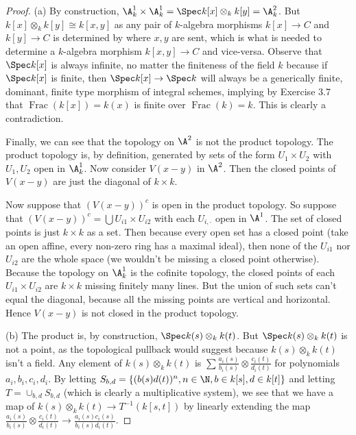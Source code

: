\begin{proof}
	(a) By construction, $\A^1_k \times \A^1_k = \Spec k[x] \otimes_k k[y] = \A^2_k$.
	But $k[x] \otimes_k k[y] \cong k[x,y] $ as any pair of $k $-algebra morphisms $k[x] \to C $ and $k[y] \to C$ is determined by where $x,y $ are sent, which is what is needed to determine a $k $-algebra morphism $k[x,y] \to C $ and vice-versa.
	Observe that $\Spec k[x] $ is always infinite, no matter the finiteness of the field $k $ because if $\Spec k[x] $ is finite, then $\Spec k[x] \to \Spec k $ will always be a generically finite, dominant, finite type morphism of integral schemes, implying by Exercise 3.7 that $\operatorname{Frac}(k[x]) = k(x) $ is finite over $\operatorname{Frac}(k) = k $.
	This is clearly a contradiction.

	Finally, we can see that the topology on $\A^2 $ is not the product topology.
	The product topology is, by definition, generated by sets of the form $U_1 \times U_2 $ with $U_{1},U_{2} $ open in $\A^1_k $.
	Now consider $V(x-y) $ in $\A^2 $.
	Then the closed points of $V(x-y) $ are just the diagonal of $k\times k $.

	Now suppose that $(V(x-y))^c $ is open in the product topology.
	So suppose that $(V(x-y))^c = \bigcup U_{i 1} \times U_{i 2} $ with each $U_{i ,\cdot} $ open in $\A^1 $.
	The set of closed points is just $k \times k $ as a set.
	Then because every open set has a closed point (take an open affine, every non-zero ring has a maximal ideal), then none of the $U_{i 1} $ nor $U_{i 2} $ are the whole space (we wouldn't be missing a closed point otherwise).
	Because the topology on $\A^1_k $ is the cofinite topology, the closed points of each $U_{i 1} \times U_{i 2} $ are $k\times k $ missing finitely many lines.
	But the union of such sets can't equal the diagonal, because all the missing points are vertical and horizontal.
	Hence $V(x-y) $ is not closed in the product topology.

	(b) The product is, by construction, $\Spec k(s) \otimes_k k(t) $.
	But $\Spec k(s) \otimes_k k(t) $ is not a point, as the topological pullback would suggest because $k(s) \otimes_k k(t) $ isn't a field.
	Any element of $k(s) \otimes_k k(t) $ is $\sum \frac{a_i(s)}{b_i(s)} \otimes \frac{c_i(t)}{d_i(t)}$ for polynomials $a_i,b_i,c_i,d_i $.
	By letting $S_{b,d} = \{(b(s) d(t))^n, n\in \N, b\in k[s], d \in k[t]\}   $ and letting $T = \cup_{b,d} S_{b,d} $ (which is clearly a multiplicative system), we see that we have a map of $k(s) \otimes_k k(t) \to T^{-1}(k[s,t]) $ by linearly extending the map $\frac{a_i(s)}{b_i(s)} \otimes \frac{c_i(t)}{d_i(t)} \to \frac{a_i(s)c_i(s)}{b_i(s)d_i(t)}$.


\end{proof}
